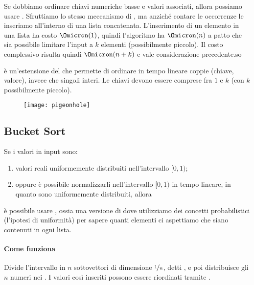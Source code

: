 Se dobbiamo ordinare chiavi numeriche basse e valori associati, allora possiamo usare \pigeonholeSort.
Sfruttiamo lo stesso meccanismo di \countingSort, ma anziché contare le occorrenze le inseriamo all'interno di una lista concatenata.
L'inserimento di un elemento in una lista ha costo \(\Omicron(1)\), quindi l'algoritmo ha \(\Omicron(n)\) a patto che sia possibile limitare l'input a \(k\) elementi (possibilmente piccolo).
Il costo complessivo risulta quindi \(\Omicron(n+k)\) e vale considerazione precedente.so

\begin{note}
\pigeonholeSort è un'estensione del \countingSort che permette di ordinare in tempo lineare coppie (chiave, valore), invece che singoli interi.
Le chiavi devono essere comprese fra \(1\) e \(k\) (con \(k\) possibilmente piccolo).
\end{note}

\begin{figure}[H]\centering
    \texttt{[image: pigeonhole]}
\end{figure}

%     

\subsection{Bucket Sort}

Se i valori in input sono:
\begin{enumerate}
    \item valori reali uniformemente distribuiti nell'intervallo \([0, 1)\);
    \item oppure è possibile normalizzarli nell'intervallo \([0,1)\) in tempo lineare, in quanto sono uniformemente distribuiti, allora
\end{enumerate}
è possibile usare \bucketSort, ossia una versione di \pigeonholeSort dove utilizziamo dei concetti probabilistici (l'ipotesi di uniformità) per sapere quanti elementi ci aspettiamo che siano contenuti in ogni lista.

\paragraph{Come funziona}
Divide l'intervallo in \(n\) sottovettori di dimensione \(\nicefrac{1}{n}\), detti , e poi distribuisce gli \(n\) numeri nei .
I valori così inseriti possono essere riordinati tramite \insertionSort.


